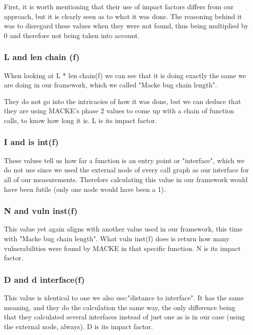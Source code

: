 First, it is worth mentioning that their use of impact factors differs from our approach, but it is clearly seen as to what it was done. The reasoning behind it was to disregard these values when they were not found, thus being multiplied by 0 and therefore not being taken into account.

\subsubsection{L and len chain (f)}

When looking at L * len chain(f) we can see that it is doing exactly the same we are doing in our framework, which we called "Macke bug chain length".

They do not go into the intricacies of how it was done, but we can deduce that they are using MACKE's phase 2 values to come up with a chain of function calls, to know how long it is. L is its impact factor.

\subsubsection{I and is int(f)}

These values tell us how far a function is an entry point or "interface", which we do not use since we used the external node of every call graph as our interface for all of our measurements. Therefore calculating this value in our framework would have been futile (only one node would have been a 1).

\subsubsection{N and vuln inst(f)}

This value yet again aligns with another value used in our framework, this time with "Macke bug chain length". What vuln inst(f) does is return how many vulnerabilities were found by MACKE in that specific function. N is its impact factor.

\subsubsection{D and d interface(f)}

This value is identical to one we also use:"distance to interface". It has the same meaning, and they do the calculation the same way, the only difference being that they calculated several interfaces instead of just one as is in our case (using the external node, always). D is its impact factor.

